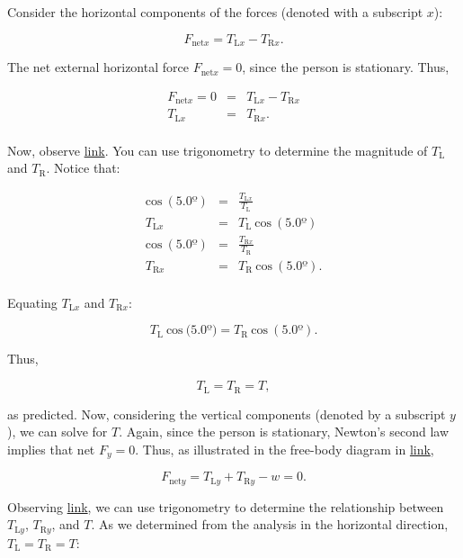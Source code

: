 \documentclass[
]{book}
\begin{document}
Consider the horizontal components of the forces (denoted with a
subscript \(x{}\)):

\leavevmode\hypertarget{eip-id2592142}{}%
\[{F_{\text{net}x} = {T_{\text{L}x} - T_{\text{R}x}}}.\]

The net external horizontal force \({F_{\text{net}x} = 0}{}\), since the
person is stationary. Thus,

\leavevmode\hypertarget{eip-id2123898}{}%
\[\begin{array}{lll}
{F_{\text{net}x} = 0} & = & {T_{\text{L}x} - T_{\text{R}x}} \\
T_{\text{L}x} & = & {T_{\text{R}x}.} \\
\end{array}{}\]

Now, observe \protect\hyperlink{import-auto-id1561864}{link}. You
can use trigonometry to determine the magnitude of \(T_{\text{L}}{}\) and
\(T_{\text{R}}{}\). Notice that:

\leavevmode\hypertarget{eip-id2130931}{}%
\[\begin{array}{lll}
{\text{cos}\ (5.0º)} & = & \frac{T_{\text{L}x}}{T_{\text{L}}} \\
T_{\text{L}x} & = & {T_{\text{L}}\ \text{cos}\ (5.0º)} \\
{\text{cos}\ (5.0º)} & = & \frac{T_{\text{R}x}}{T_{\text{R}}} \\
T_{\text{R}x} & = & {T_{\text{R}}\ \text{cos}\ (5.0º).} \\
\end{array}\]

Equating \(T_{\text{L}x}{}\) and \(T_{\text{R}x}{}\):

\leavevmode\hypertarget{eip-id2382116}{}%
\[{T_{\text{L}}\ \text{cos}\ (5.0º{) = T_{\text{R}}}\ \text{cos}\ (5.0º)}.\]

Thus,

\leavevmode\hypertarget{eip-id2350456}{}%
\[{{T_{\text{L}} = T_{\text{R}}} = T},\]

as predicted. Now, considering the vertical components (denoted by a
subscript \(y{}\)), we can solve for \(T{}\). Again, since the person is
stationary, Newton's second law implies that net \({F_{y} = 0}{}\). Thus,
as illustrated in the free-body diagram in
\protect\hyperlink{import-auto-id1561864}{link},

\leavevmode\hypertarget{eip-id1851063}{}%
\[{{F_{\text{net}y} = {{T_{\text{L}y} + T_{\text{R}y}} - w}} = 0}.\]

Observing \protect\hyperlink{import-auto-id1561864}{link}, we can
use trigonometry to determine the relationship between
\(T_{\text{L}y}{}\), \(T_{\text{R}y}{}\), and \(T{}\). As we determined from
the analysis in the horizontal direction,
\({{T_{\text{L}} = T_{\text{R}}} = T}{}\):
\end{document}
